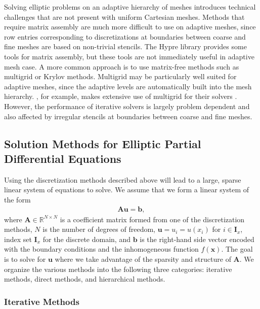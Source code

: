 Solving elliptic problems on an adaptive hierarchy of meshes introduces technical challenges that are not present with uniform Cartesian meshes. Methods that require matrix assembly are much more difficult to use on adaptive meshes, since row entries corresponding to discretizations at boundaries between coarse and fine meshes are based on non-trivial stencils.  The Hypre library \citep{falgout2002hypre} provides some tools for matrix assembly, but these tools are not immediately useful in adaptive mesh case. A more common approach is to use matrix-free methods such as multigrid or Krylov methods.  Multigrid may be particularly well suited for adaptive meshes, since the adaptive levels are automatically built into the mesh hierarchy. \amrex, for example, makes extensive use of multigrid for their solvers \citep{zhang2019amrex}.  However, the performance of iterative solvers is largely problem dependent and also affected by irregular stencils at boundaries between coarse and fine meshes.

\subsection{Solution Methods for Elliptic Partial Differential Equations}
\label{sec:solution-methods-for-elliptic-pdes}

Using the discretization methods described above will lead to a large, sparse linear system of equations to solve. We assume that we form a linear system of the form
\begin{align}
    \textbf{A} \textbf{u} = \textbf{b},
    \label{eq:ls}
\end{align}
where $\textbf{A} \in \mathbb{R}^{N \times N}$ is a coefficient matrix formed from one of the discretization methods, $N$ is the number of degrees of freedom, $\textbf{u} = u_i = u(x_i)$ for $i \in \textbf{I}_x$, index set $\textbf{I}_x$ for the discrete domain, and $\textbf{b}$ is the right-hand side vector encoded with the boundary conditions and the inhomogeneous function $f(\textbf{x})$. The goal is to solve for $\textbf{u}$ where we take advantage of the sparsity and structure of $\textbf{A}$. We organize the various methods into the following three categories: iterative methods, direct methods, and hierarchical methods.

\subsubsection{Iterative Methods}
\label{sub:iterative-methods}

